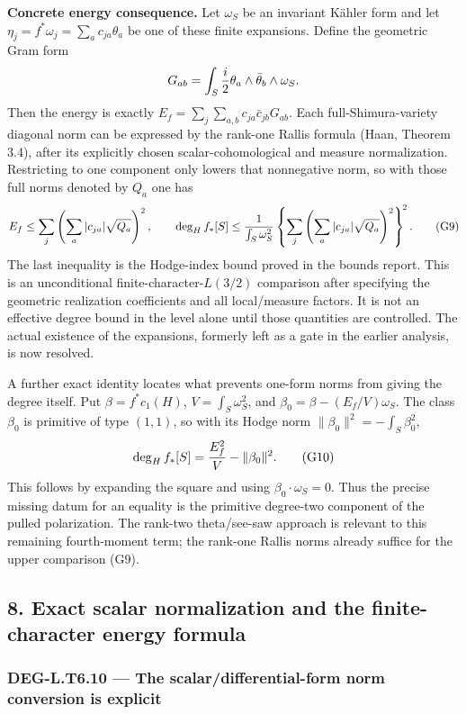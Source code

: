 \documentclass[11pt,a4paper]{article}
\theoremstyle{definition}
\begin{document}
\textbf{Concrete energy consequence.} Let \(\omega_S\) be an invariant Kähler form and let \(\eta_j=f^*\omega_j=\sum_a c_{ja}\theta_a\) be one of these finite expansions. Define the geometric Gram form \[
G_{ab}=\int_S {i\over2}\theta_a\wedge\bar\theta_b\wedge\omega_S.
\] Then the energy is exactly \(E_f=\sum_j\sum_{a,b}c_{ja}\bar c_{jb}G_{ab}\). Each full-Shimura-variety diagonal norm can be expressed by the rank-one Rallis formula (Haan, Theorem 3.4), after its explicitly chosen scalar-cohomological and measure normalization. Restricting to one component only lowers that nonnegative norm, so with those full norms denoted by \(Q_a\) one has \[
E_f\le\sum_j\left(\sum_a|c_{ja}|\sqrt{Q_a}\right)^2,
\qquad
\deg_H f_*[S]\le{1\over\int_S\omega_S^2}
\left\{\sum_j\left(\sum_a|c_{ja}|\sqrt{Q_a}\right)^2\right\}^{\!2}.
\tag{G9}
\] The last inequality is the Hodge-index bound proved in the bounds report. This is an unconditional finite-character-\(L(3/2)\) comparison after specifying the geometric realization coefficients and all local/measure factors. It is not an effective degree bound in the level alone until those quantities are controlled. The actual existence of the expansions, formerly left as a gate in the earlier analysis, is now resolved.

A further exact identity locates what prevents one-form norms from giving the degree itself. Put \(\beta=f^*c_1(H)\), \(V=\int_S\omega_S^2\), and \(\beta_0=\beta-(E_f/V)\omega_S\). The class \(\beta_0\) is primitive of type \((1,1)\), so with its Hodge norm \(\|\beta_0\|^2=-\int_S\beta_0^2\), \[
\deg_H f_*[S]={E_f^2\over V}-\|\beta_0\|^2.
\tag{G10}
\] This follows by expanding the square and using \(\beta_0\cdot\omega_S=0\). Thus the precise missing datum for an equality is the primitive degree-two component of the pulled polarization. The rank-two theta/see-saw approach is relevant to this remaining fourth-moment term; the rank-one Rallis norms already suffice for the upper comparison (G9).

\subsection{8. Exact scalar normalization and the finite-character energy formula}\label{exact-scalar-normalization-and-the-finite-character-energy-formula}

\subsubsection{DEG-L.T6.10 --- The scalar/differential-form norm conversion is explicit}\label{DEG-L.T6.10}
\end{document}
